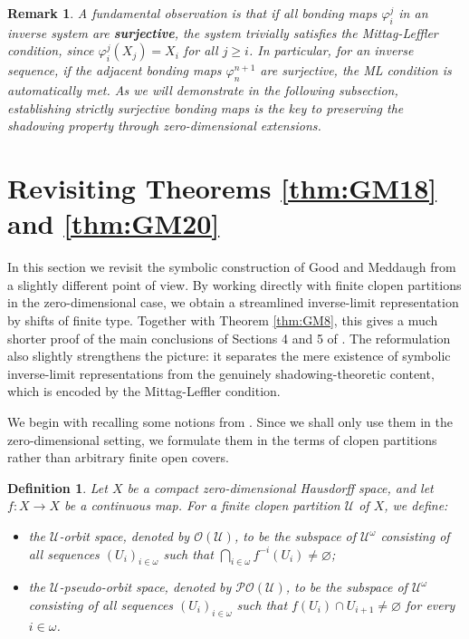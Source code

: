 \documentclass[10pt,a4paper]{amsart}
\newtheorem{definition}[theorem]{Definition}
\numberwithin{equation}{section}
\newtheorem{remark}[theorem]{Remark}
\begin{document}
\begin{remark}\label{rmk:trivial_ML}
A fundamental observation is that if all bonding maps $\varphi_i^j$ in an inverse system are \textbf{surjective}, the system trivially satisfies the Mittag-Leffler condition, since $\varphi_i^j(X_j) = X_i$ for all $j \ge i$. In particular, for an inverse sequence, if the adjacent bonding maps $\varphi_n^{n+1}$ are surjective, the ML condition is automatically met. As we will demonstrate in the following subsection, establishing strictly surjective bonding maps is the key to preserving the shadowing property through zero-dimensional extensions.
\end{remark}


\section{Revisiting Theorems \ref{thm:GM18} and \ref{thm:GM20}}\label{revisit}

In this section we revisit the symbolic construction of Good and Meddaugh
from a slightly different point of view. By working directly with finite clopen
partitions in the zero-dimensional case, we obtain a streamlined inverse-limit
representation by shifts of finite type. Together with Theorem \ref{thm:GM8},
this gives a much shorter proof of the main conclusions of Sections 4 and 5 of
\cite{GM}. The reformulation also slightly strengthens the picture: it separates
the mere existence of symbolic inverse-limit representations from the genuinely
shadowing-theoretic content, which is encoded by the Mittag-Leffler condition.

We begin with recalling some notions from \cite{GM}. Since we shall only use them in the zero-dimensional setting, we formulate them in the terms of clopen partitions rather than arbitrary finite open covers.

\begin{definition}
Let $X$ be a compact zero-dimensional Hausdorff space, and let $f:X\to X$ be a
continuous map. For a finite clopen partition $\mathcal U$ of $X$, we define:
\begin{itemize}
\item the \emph{$\mathcal U$-orbit space}, denoted by
$\mathcal O(\mathcal U)$, to be the subspace of $\mathcal U^\omega$ consisting
of all sequences $(U_i)_{i\in\omega}$ such that
$\bigcap_{i\in\omega} f^{-i}(U_i)\neq\varnothing$;

\item the \emph{$\mathcal U$-pseudo-orbit space}, denoted by
$\mathcal{PO}(\mathcal U)$, to be the subspace of $\mathcal U^\omega$ consisting
of all sequences $(U_i)_{i\in\omega}$ such that
$f(U_i)\cap U_{i+1}\neq\varnothing$ for every $i\in\omega$.
\end{itemize}
\end{definition}
\end{document}

